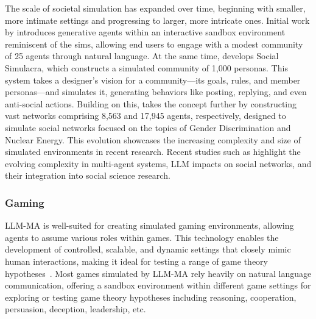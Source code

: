 The scale of societal simulation has expanded over time, beginning with smaller, more intimate settings and progressing to larger, more intricate ones. 
Initial work by \cite{park2023generative} introduces generative agents within an interactive sandbox environment reminiscent of the sims, allowing end users to engage with a modest community of 25 agents through natural language. 
At the same time, \cite{park2022social} develops Social Simulacra, which constructs a simulated community of 1,000 personas. This system takes a designer's vision for a community—its goals, rules, and member personas—and simulates it, generating behaviors like posting, replying, and even anti-social actions.
Building on this, \cite{gao2023s} takes the concept further by constructing vast networks comprising 8,563 and 17,945 agents, respectively, designed to simulate social networks focused on the topics of Gender Discrimination and Nuclear Energy. This evolution showcases the increasing complexity and size of simulated environments in recent research.
Recent studies such as \cite{chen2023multi,kaiya2023lyfe,li2023quantifying,li2023you,ziems2023can} highlight the evolving complexity in multi-agent systems, LLM impacts on social networks, and their integration into social science research.
 
\subsubsection{Gaming}
LLM-MA is well-suited for creating simulated gaming environments, allowing agents to assume various roles within games. This technology enables the development of controlled, scalable, and dynamic settings that closely mimic human interactions, making it ideal for testing a range of game theory hypotheses~\cite{mao2023alympics,xu2023exploring,gong2023mindagent}. 
Most games simulated by LLM-MA rely heavily on natural language communication, offering a sandbox environment within different game settings for exploring or testing game theory hypotheses including reasoning, cooperation, persuasion, deception, leadership, etc. 

